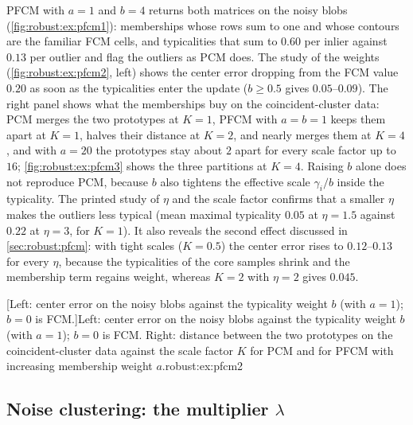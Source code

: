 PFCM with $a=1$ and $b=4$ returns both matrices on the noisy blobs (\cref{fig:robust:ex:pfcm1}): memberships whose rows sum to one and whose contours are the familiar FCM cells, and typicalities that sum to $0.60$ per inlier against $0.13$ per outlier and flag the outliers as PCM does. The study of the weights (\cref{fig:robust:ex:pfcm2}, left) shows the center error dropping from the FCM value $0.20$ as soon as the typicalities enter the update ($b\ge0.5$ gives $0.05$--$0.09$). The right panel shows what the memberships buy on the coincident-cluster data: PCM merges the two prototypes at $K=1$, PFCM with $a=b=1$ keeps them apart at $K=1$, halves their distance at $K=2$, and nearly merges them at $K=4$, and with $a=20$ the prototypes stay about $2$ apart for every scale factor up to $16$; \cref{fig:robust:ex:pfcm3} shows the three partitions at $K=4$. Raising $b$ alone does not reproduce PCM, because $b$ also tightens the effective scale $\gamma_i/b$ inside the typicality. The printed study of $\eta$ and the scale factor confirms that a smaller $\eta$ makes the outliers less typical (mean maximal typicality $0.05$ at $\eta=1.5$ against $0.22$ at $\eta=3$, for $K=1$). It also reveals the second effect discussed in \cref{sec:robust:pfcm}: with tight scales ($K=0.5$) the center error rises to $0.12$--$0.13$ for every $\eta$, because the typicalities of the core samples shrink and the membership term regains weight, whereas $K=2$ with $\eta=2$ gives $0.045$.

[Left: center error on the noisy blobs against the typicality weight $b$ (with $a=1$); $b=0$ is FCM.]{Left: center error on the noisy blobs against the typicality weight $b$ (with $a=1$); $b=0$ is FCM. Right: distance between the two prototypes on the coincident-cluster data against the scale factor $K$ for PCM and for PFCM with increasing membership weight $a$.}{robust:ex:pfcm2}

\subsection{Noise clustering: the multiplier \texorpdfstring{$\lambda$}{lambda}}\label{sec:robust:ex:nc}

